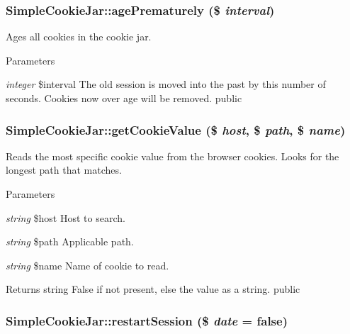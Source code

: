 \hypertarget{class_simple_cookie_jar_ab196bbf77b5906ace88b09db7bb004c3}{
\subsubsection[{agePrematurely}]{\setlength{\rightskip}{0pt plus 5cm}SimpleCookieJar::agePrematurely (\$ {\em interval})}}
\label{class_simple_cookie_jar_ab196bbf77b5906ace88b09db7bb004c3}
Ages all cookies in the cookie jar. 
\begin{DoxyParams}{Parameters}
\item[{\em integer}]\$interval The old session is moved into the past by this number of seconds. Cookies now over age will be removed.  public \end{DoxyParams}
\hypertarget{class_simple_cookie_jar_a8c8f383919cd80b15c74afc43d0cb189}{
\subsubsection[{getCookieValue}]{\setlength{\rightskip}{0pt plus 5cm}SimpleCookieJar::getCookieValue (\$ {\em host}, \/  \$ {\em path}, \/  \$ {\em name})}}
\label{class_simple_cookie_jar_a8c8f383919cd80b15c74afc43d0cb189}
Reads the most specific cookie value from the browser cookies. Looks for the longest path that matches. 
\begin{DoxyParams}{Parameters}
\item[{\em string}]\$host Host to search. \item[{\em string}]\$path Applicable path. \item[{\em string}]\$name Name of cookie to read. \end{DoxyParams}
\begin{DoxyReturn}{Returns}
string False if not present, else the value as a string.  public 
\end{DoxyReturn}
\hypertarget{class_simple_cookie_jar_aa31bb3d759c78564f9390a21d39bbc41}{
\subsubsection[{restartSession}]{\setlength{\rightskip}{0pt plus 5cm}SimpleCookieJar::restartSession (\$ {\em date} = {\ttfamily false})}}
